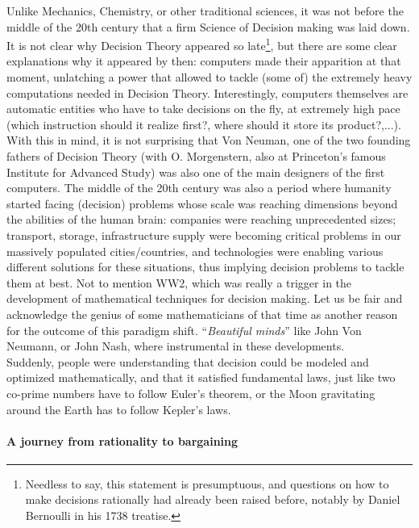 Unlike Mechanics, Chemistry, or other traditional sciences, it was not before the middle of the 20th century that a firm Science of Decision making was laid down.  It is not clear why Decision Theory appeared so late\footnote{Needless to say, this statement is presumptuous, and questions on how to make decisions rationally had already been raised before, notably by Daniel Bernoulli in his 1738 treatise.}, but there are some clear explanations why it appeared by then: computers made their apparition at that moment, unlatching a power that allowed to tackle (some of) the extremely heavy computations needed in Decision Theory.  Interestingly, computers themselves are automatic entities who have to take decisions on the fly, at extremely high pace (which instruction should it realize first?, where should it store its product?,...).  With this in mind, it is not surprising that Von Neuman, one of the two founding fathers of Decision Theory (with O. Morgenstern, also at Princeton's famous Institute for Advanced Study) was also one of the main designers of the first computers.
The middle of the 20th century was also a period where humanity started facing (decision) problems whose scale was reaching dimensions beyond the abilities of the human brain: companies were reaching unprecedented sizes; transport, storage, infrastructure supply were becoming critical problems in our massively populated cities/countries, and technologies were enabling various different solutions for these situations, thus implying decision problems to tackle them at best.  Not to mention WW2, which was really a trigger in the development of mathematical techniques for decision making. 
Let us be fair and acknowledge the genius of some mathematicians of that time as another reason for the outcome of this paradigm shift. ``\emph{Beautiful minds}'' like John Von Neumann, or John Nash, where instrumental in these developments.\\
Suddenly, people were understanding that decision could be modeled and optimized mathematically, and that it satisfied fundamental laws, just like two co-prime numbers have to follow Euler's theorem, or the Moon gravitating around the Earth has to follow Kepler's laws.  

\paragraph{A journey from rationality to bargaining}

